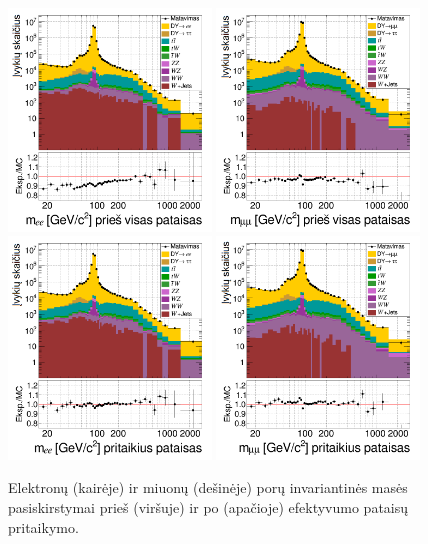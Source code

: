 \documentclass[a4paper, 12pt, oneside]{article}
\begin{document}
\begin{figure}[tbp]
	\includegraphics[width=0.48\textwidth]{ee_mass_beforeALLcorr.png}
	\includegraphics[width=0.48\textwidth]{mumu_mass_beforeALLcorr.png}
	\includegraphics[width=0.48\textwidth]{ee_mass_after.png}
	\includegraphics[width=0.48\textwidth]{mumu_mass_after.png}
	\caption{\label{fig:invMba} Elektronų (kairėje) ir miuonų (dešinėje) porų invariantinės masės pasiskirstymai
		prieš (viršuje) ir po (apačioje) efektyvumo pataisų pritaikymo.}
\end{figure}
\end{document}
